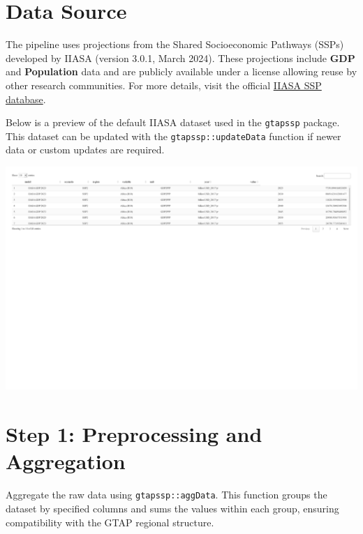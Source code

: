 \documentclass[
  letterpaper,
  DIV=11,
  numbers=noendperiod]{scrartcl}
\newenvironment{Shaded}{}{}
\newcommand{\NormalTok}[1]{\textcolor[rgb]{0.12,0.11,0.11}{#1}}
\newcommand{\SpecialCharTok}[1]{\textcolor[rgb]{0.24,0.68,0.91}{#1}}
\begin{document}
\section{Data Source}\label{data-source}

The pipeline uses projections from the Shared Socioeconomic Pathways
(SSPs) developed by IIASA (version 3.0.1, March 2024). These projections
include \textbf{GDP} and \textbf{Population} data and are publicly
available under a license allowing reuse by other research communities.
For more details, visit the official
\href{https://data.ece.iiasa.ac.at/ssp}{IIASA SSP database}.

Below is a preview of the default IIASA dataset used in the
\texttt{gtapssp} package. This dataset can be updated with the
\texttt{gtapssp::updateData} function if newer data or custom updates
are required.

\begin{Shaded}
\end{Shaded}

\includegraphics{index_files/figure-pdf/unnamed-chunk-6-1.pdf}

\section{Step 1: Preprocessing and
Aggregation}\label{step-1-preprocessing-and-aggregation}

Aggregate the raw data using \texttt{gtapssp::aggData}. This function
groups the dataset by specified columns and sums the values within each
group, ensuring compatibility with the GTAP regional structure.
\end{document}
